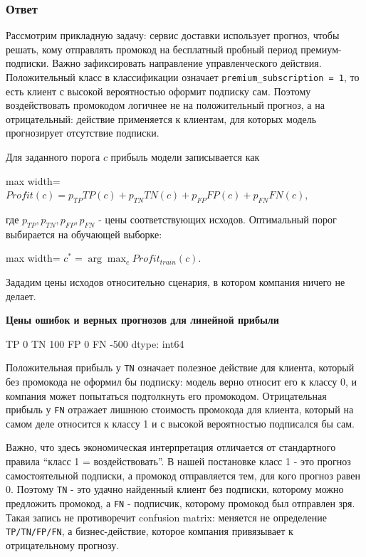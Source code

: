 \documentclass[11pt]{article}
\begin{document}
\subsubsection{Ответ}

Рассмотрим прикладную задачу: сервис доставки использует прогноз, чтобы
решать, кому отправлять промокод на бесплатный пробный период
премиум-подписки. Важно зафиксировать направление управленческого
действия. Положительный класс в классификации означает
\texttt{premium\_subscription\ =\ 1}, то есть клиент с высокой
вероятностью оформит подписку сам. Поэтому воздействовать промокодом
логичнее не на положительный прогноз, а на отрицательный: действие
применяется к клиентам, для которых модель прогнозирует отсутствие
подписки.

Для заданного порога \(c\) прибыль модели записывается как

\begin{center}
\begin{adjustbox}{max width=\linewidth}
\(\displaystyle Profit(c) = p_{TP}TP(c) + p_{TN}TN(c) + p_{FP}FP(c) + p_{FN}FN(c),\)
\end{adjustbox}
\end{center}

где \(p_{TP}, p_{TN}, p_{FP}, p_{FN}\) - цены соответствующих исходов.
Оптимальный порог выбирается на обучающей выборке:

\begin{center}
\begin{adjustbox}{max width=\linewidth}
\(\displaystyle c^* = \arg\max_c Profit_{train}(c).\)
\end{adjustbox}
\end{center}

    Зададим цены исходов относительно сценария, в котором компания ничего не
делает.

    \textbf{Цены ошибок и верных прогнозов для линейной прибыли}

TP 0 TN 100 FP 0 FN -500 dtype: int64

    Положительная прибыль у \texttt{TN} означает полезное действие для
клиента, который без промокода не оформил бы подписку: модель верно
относит его к классу 0, и компания может попытаться подтолкнуть его
промокодом. Отрицательная прибыль у \texttt{FN} отражает лишнюю
стоимость промокода для клиента, который на самом деле относится к
классу 1 и с высокой вероятностью подписался бы сам.

Важно, что здесь экономическая интерпретация отличается от стандартного
правила ``класс 1 = воздействовать''. В нашей постановке класс 1 - это
прогноз самостоятельной подписки, а промокод отправляется тем, для кого
прогноз равен 0. Поэтому \texttt{TN} - это удачно найденный клиент без
подписки, которому можно предложить промокод, а \texttt{FN} - подписчик,
которому промокод был отправлен зря. Такая запись не противоречит
confusion matrix: меняется не определение \texttt{TP/TN/FP/FN}, а
бизнес-действие, которое компания привязывает к отрицательному прогнозу.
\end{document}
